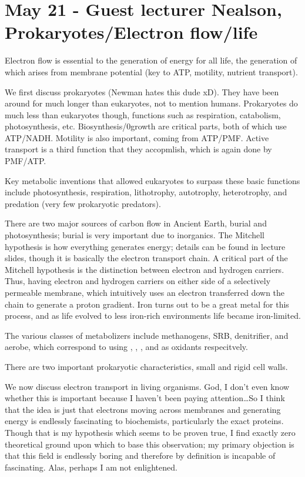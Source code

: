 \documentclass[12pt]{article}
\begin{document}
\section*{May 21 - Guest lecturer Nealson, Prokaryotes/Electron flow/life}

Electron flow is essential to the generation of energy for all life, the generation of which arises from membrane potential (key to ATP, motility, nutrient transport).

We first discuss prokaryotes (Newman hates this dude xD). They have been around for much longer than eukaryotes, not to mention humans. Prokaryotes do much less than eukaryotes though, functions such as respiration, catabolism, photosynthesis, etc. Biosynthesis/0growth are critical parts, both of which use ATP/NADH. Motility is also important, coming from ATP/PMF. Active transport is a third function that they accopmlish, which is again done by PMF/ATP.

Key metabolic inventions that allowed eukaryotes to surpass these basic functions include photosynthesis, respiration, lithotrophy, autotrophy, heterotrophy, and predation (very few prokaryotic predators).

There are two major sources of carbon flow in Ancient Earth, burial and photosynthesis; burial is very important due to inorganics.  The Mitchell hypothesis is how everything generates energy; details can be found in lecture slides, though it is basically the electron transport chain. A critical part of the Mitchell hypothesis is the distinction between electron and hydrogen carriers. Thus, having electron and hydrogen carriers on either side of a selectively permeable membrane, which intuitively uses an electron transferred down the chain to generate a proton gradient. Iron turns out to be a great metal for this process, and as life evolved to less iron-rich environments life became iron-limited. 

The various classes of metabolizers include methanogens, SRB, denitrifier, and aerobe, which correspond to using , , , and  as oxidants respecitvely. 

There are two important prokaryotic characteristics, small and rigid cell walls. 

We now discuss electron transport in living organisms. God, I don't even know whether this is important because I haven't been paying attention\dots So I think that the idea is just that electrons moving across membranes and generating energy is endlessly fascinating to biochemists, particularly the exact proteins. Though that is my hypothesis which seems to be proven true, I find exactly zero theoretical ground upon which to base this observation; my primary objection is that this field is endlessly boring and therefore by definition is incapable of fascinating. Alas, perhaps I am not enlightened.
\end{document}
